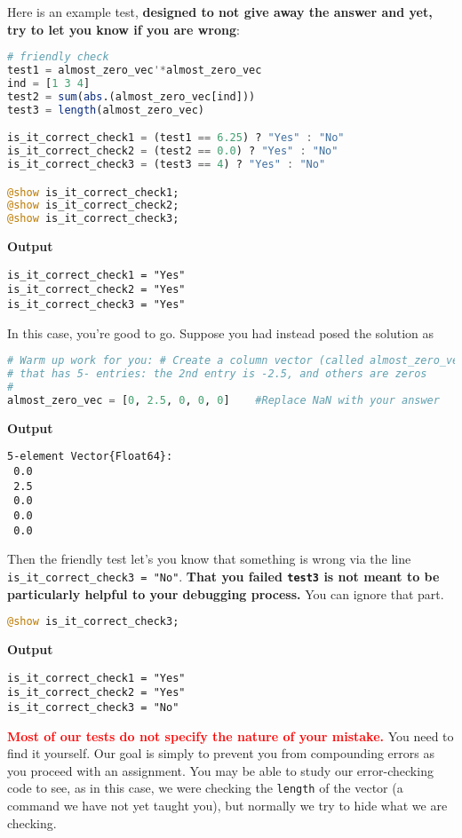 Here is an example test, \textbf{designed to not give away the answer and yet, try to let you know if you are wrong}:

\begin{lstlisting}[language=Julia,style=mystyle]
# friendly check
test1 = almost_zero_vec'*almost_zero_vec
ind = [1 3 4]
test2 = sum(abs.(almost_zero_vec[ind]))
test3 = length(almost_zero_vec)

is_it_correct_check1 = (test1 == 6.25) ? "Yes" : "No" 
is_it_correct_check2 = (test2 == 0.0) ? "Yes" : "No"
is_it_correct_check3 = (test3 == 4) ? "Yes" : "No"

@show is_it_correct_check1;  
@show is_it_correct_check2; 
@show is_it_correct_check3;  
\end{lstlisting}
\textbf{Output} 
\begin{verbatim}
is_it_correct_check1 = "Yes"
is_it_correct_check2 = "Yes"
is_it_correct_check3 = "Yes"
\end{verbatim}

In this case, you're good to go. Suppose you had instead posed the solution as 

\begin{lstlisting}[language=Julia,style=mystyle]
# Warm up work for you: # Create a column vector (called almost_zero_vec) 
# that has 5- entries: the 2nd entry is -2.5, and others are zeros
# 
almost_zero_vec = [0, 2.5, 0, 0, 0]    #Replace NaN with your answer
\end{lstlisting}
\textbf{Output} 
\begin{verbatim}
5-element Vector{Float64}:
 0.0
 2.5
 0.0
 0.0
 0.0
\end{verbatim}

Then the friendly test let's you know that something is wrong via the line \texttt{is\_it\_correct\_check3 = "No"}. \textbf{That you failed \texttt{test3} is not meant to be particularly helpful to your debugging process.} You can ignore that part. 
\begin{lstlisting}[language=Julia,style=mystyle]
@show is_it_correct_check3;  
\end{lstlisting}
\textbf{Output} 
\begin{verbatim}
is_it_correct_check1 = "Yes"
is_it_correct_check2 = "Yes"
is_it_correct_check3 = "No"
\end{verbatim}
\textcolor{red}{\bf Most of our tests do not specify the nature of your mistake.} You need to find it yourself. Our goal is simply to prevent you from compounding errors as you proceed with an assignment. You may be able to study our error-checking code to see, as in this case, we were checking the \texttt{length} of the vector (a command we have not yet taught you), but normally we try to hide what we are checking. \\

